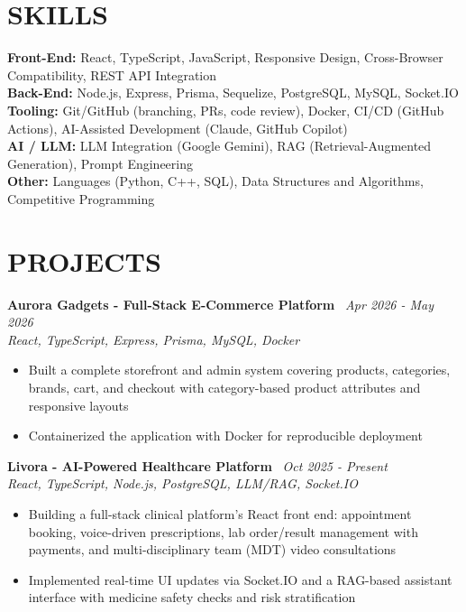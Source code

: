 \documentclass[10.5pt,a4paper]{article}
\newenvironment{tightitemize}{
  \begin{itemize}[leftmargin=15pt, itemsep=1pt, parsep=0pt, topsep=2pt]
}{
  \end{itemize}
}
\newcommand{\entrysimple}[2]{%
  \textbf{#1} \textbar\ \textit{#2}\\[1pt]
}
\begin{document}
\section*{SKILLS}
\textbf{Front-End:} React, TypeScript, JavaScript, Responsive Design, Cross-Browser Compatibility, REST API Integration\\[2pt]
\textbf{Back-End:} Node.js, Express, Prisma, Sequelize, PostgreSQL, MySQL, Socket.IO\\[2pt]
\textbf{Tooling:} Git/GitHub (branching, PRs, code review), Docker, CI/CD (GitHub Actions), AI-Assisted Development (Claude, GitHub Copilot)\\[2pt]
\textbf{AI / LLM:} LLM Integration (Google Gemini), RAG (Retrieval-Augmented Generation), Prompt Engineering\\[2pt]
\textbf{Other:} Languages (Python, C++, SQL), Data Structures and Algorithms, Competitive Programming

\section*{PROJECTS}

\entrysimple{Aurora Gadgets - Full-Stack E-Commerce Platform}{Apr 2026 - May 2026}
\textit{React, TypeScript, Express, Prisma, MySQL, Docker}
\begin{tightitemize}
  \item Built a complete storefront and admin system covering products, categories, brands, cart, and checkout with category-based product attributes and responsive layouts
  \item Containerized the application with Docker for reproducible deployment
\end{tightitemize}

\entrysimple{Livora - AI-Powered Healthcare Platform}{Oct 2025 - Present}
\textit{React, TypeScript, Node.js, PostgreSQL, LLM/RAG, Socket.IO}
\begin{tightitemize}
  \item Building a full-stack clinical platform's React front end: appointment booking, voice-driven prescriptions, lab order/result management with payments, and multi-disciplinary team (MDT) video consultations
  \item Implemented real-time UI updates via Socket.IO and a RAG-based assistant interface with medicine safety checks and risk stratification
\end{tightitemize}
\end{document}
